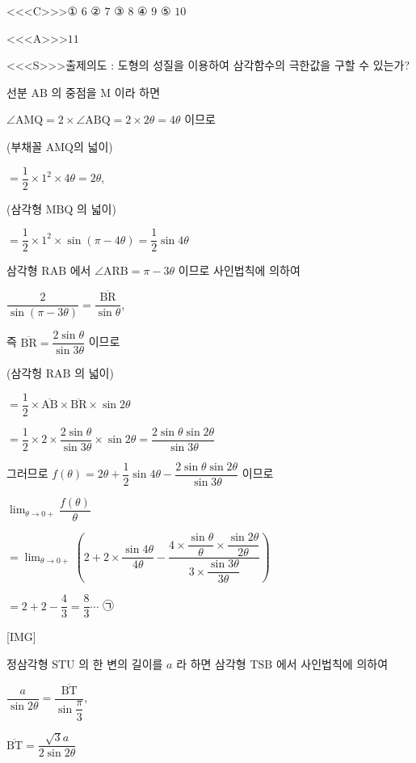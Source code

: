 \documentclass{oblivoir}
\begin{document}
<<<C>>>① $6$
② $7$
③ $8$
④ $9$
⑤ $10$


<<<A>>>$11$

<<<S>>>출제의도 : 도형의 성질을 이용하여 삼각함수의 극한값을 구할 수 있는가?


선분 $\mathrm{AB}$ 의 중점을 $\mathrm{M}$ 이라 하면

$\angle \mathrm{AMQ}=2 \times \angle \mathrm{ABQ}=2 \times 2 \theta=4 \theta$
이므로

(부채꼴 $\mathrm{AMQ}$의 넓이)

$=\dfrac{1}{2} \times 1^{2} \times 4 \theta=2 \theta$,

(삼각형 $\mathrm{MBQ}$ 의 넓이)

$=\dfrac{1}{2} \times 1^{2} \times \sin (\pi-4 \theta)=\dfrac{1}{2} \sin 4 \theta$

삼각형 $\mathrm{RAB}$ 에서 $\angle \mathrm{ARB}=\pi-3 \theta$ 이므로
사인법칙에 의하여

$\dfrac{2}{\sin (\pi-3 \theta)}=\dfrac{\overline{\mathrm{BR}}}{\sin \theta}$,

즉
$\overline{\mathrm{BR}}=\dfrac{2 \sin \theta}{\sin 3 \theta}$
이므로

(삼각헝 $\mathrm{RAB}$ 의 넓이)

$=\dfrac{1}{2} \times \overline{\mathrm{AB}} \times \overline{\mathrm{BR}} \times \sin 2 \theta$

$=\dfrac{1}{2} \times 2 \times \dfrac{2 \sin \theta}{\sin 3 \theta} \times \sin 2 \theta=\dfrac{2 \sin \theta \sin 2 \theta}{\sin 3 \theta}$

그러므로
$f(\theta)=2 \theta+\dfrac{1}{2} \sin 4 \theta-\dfrac{2 \sin \theta \sin 2 \theta}{\sin 3 \theta}$
이므로

$\displaystyle\lim _{\theta \rightarrow 0+} \dfrac{f(\theta)}{\theta}$

$=\displaystyle\lim _{\theta \rightarrow 0+}\left(2+2 \times \dfrac{\sin 4 \theta}{4 \theta}-\dfrac{4 \times \dfrac{\sin \theta}{\theta} \times \dfrac{\sin 2 \theta}{2 \theta}}{3 \times \dfrac{\sin 3 \theta}{3 \theta}}\right)$

$=2+2-\dfrac{4}{3}=\dfrac{8}{3} \cdots$ ㉠

[IMG]

정삼각형 $\mathrm{STU}$ 의 한 변의 길이를 $a$ 라 하면 삼각형 $\mathrm{TSB}$ 에서 사인법칙에 의하여

$\dfrac{a}{\sin 2 \theta}=\dfrac{\overline{\mathrm{BT}}}{\sin \dfrac{\pi}{3}}$,

$\overline{\mathrm{BT}}=\dfrac{\sqrt{3} a}{2 \sin 2 \theta}$
\end{document}
